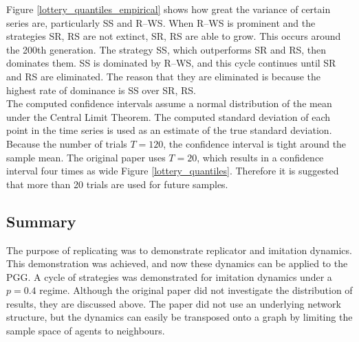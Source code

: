 \FloatBarrier
{}
\FloatBarrier
Figure \ref{lottery_quantiles_empirical} shows how great the variance of certain series are, particularly SS and R--WS. When R--WS is prominent and the strategies SR, RS are not extinct, SR, RS are able to grow. This occurs around the 200th generation. The strategy SS, which outperforms SR and RS, then dominates them. SS is dominated by R--WS, and this cycle continues until SR and RS are eliminated. The reason that they are eliminated is because the highest rate of dominance is SS over SR, RS. \\
\FloatBarrier
{}
\FloatBarrier
 The computed confidence intervals assume a normal distribution of the mean under the Central Limit Theorem. The computed standard deviation of each point in the time series is used as an estimate of the true standard deviation. Because the number of trials $T=120$, the confidence interval is tight around the sample mean. The original paper uses $T=20$, which results in a confidence interval four times as wide Figure \ref{lottery_quantiles}. Therefore it is suggested that more than 20 trials are used for future samples. \\



\subsection{Summary}
The purpose of replicating \cite{RN30} was to demonstrate replicator and imitation dynamics. This demonstration was achieved, and now these dynamics can be applied to the PGG. A cycle of strategies was demonstrated for imitation dynamics under a $p=0.4$ regime. Although the original paper did not investigate the distribution of results, they are discussed above. The paper \cite{RN30} did not use an underlying network structure, but the dynamics can easily be transposed onto a graph by limiting the sample space of agents to neighbours. \\


